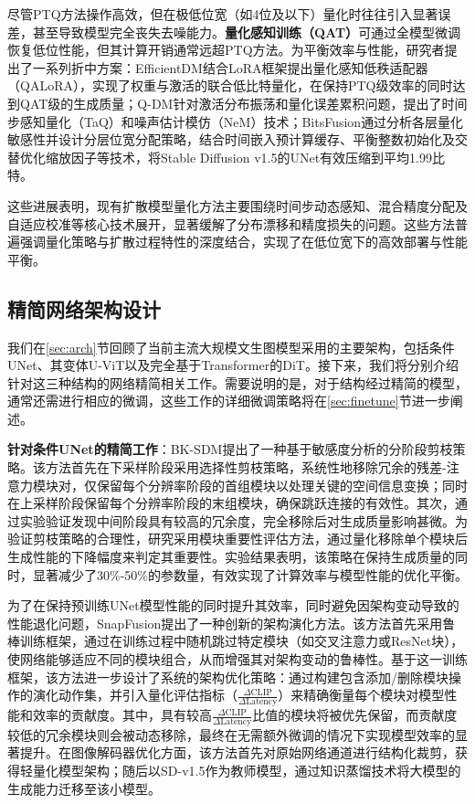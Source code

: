 \documentclass[11pt,a4paper,UTF8]{ctexart}
\begin{document}
尽管PTQ方法操作高效，但在极低位宽（如4位及以下）量化时往往引入显著误差，甚至导致模型完全丧失去噪能力\cite{he2023ptqd}。\textbf{量化感知训练（QAT）}\cite{krishnamoorthi2018quantizing,esser2019learned}可通过全模型微调恢复低位性能，但其计算开销通常远超PTQ方法。为平衡效率与性能，研究者提出了一系列折中方案：EfficientDM\cite{he2024efficientdm}结合LoRA框架\cite{hu2022lora}提出量化感知低秩适配器（QALoRA），实现了权重与激活的联合低比特量化，在保持PTQ级效率的同时达到QAT级的生成质量；Q-DM\cite{li2023qdm}针对激活分布振荡和量化误差累积问题，提出了时间步感知量化（TaQ）和噪声估计模仿（NeM）技术；BitsFusion\cite{sui2024bitsfusion}通过分析各层量化敏感性并设计分层位宽分配策略，结合时间嵌入预计算缓存、平衡整数初始化及交替优化缩放因子等技术，将Stable Diffusion v1.5的UNet有效压缩到平均1.99比特。

这些进展表明，现有扩散模型量化方法主要围绕时间步动态感知、混合精度分配及自适应校准等核心技术展开，显著缓解了分布漂移和精度损失的问题。这些方法普遍强调量化策略与扩散过程特性的深度结合，实现了在低位宽下的高效部署与性能平衡。


\subsection{精简网络架构设计}

我们在\ref{sec:arch}节回顾了当前主流大规模文生图模型采用的主要架构，包括条件UNet\cite{rombach2022high}、其变体U-ViT\cite{uvit}以及完全基于Transformer的DiT\cite{peebles2022scalable}。接下来，我们将分别介绍针对这三种结构的网络精简相关工作。需要说明的是，对于结构经过精简的模型，通常还需进行相应的微调，这些工作的详细微调策略将在\ref{sec:finetune}节进一步阐述。

\textbf{针对条件UNet的精简工作}：BK-SDM\cite{kim2023bk}提出了一种基于敏感度分析的分阶段剪枝策略。该方法首先在下采样阶段采用选择性剪枝策略，系统性地移除冗余的残差-注意力模块对，仅保留每个分辨率阶段的首组模块以处理关键的空间信息变换；同时在上采样阶段保留每个分辨率阶段的末组模块，确保跳跃连接的有效性。其次，通过实验验证发现中间阶段具有较高的冗余度，完全移除后对生成质量影响甚微。为验证剪枝策略的合理性，研究采用模块重要性评估方法，通过量化移除单个模块后生成性能的下降幅度来判定其重要性。实验结果表明，该策略在保持生成质量的同时，显著减少了30\%-50\%的参数量，有效实现了计算效率与模型性能的优化平衡。

为了在保持预训练UNet模型性能的同时提升其效率，同时避免因架构变动导致的性能退化问题，SnapFusion\cite{li2023snapfusion}提出了一种创新的架构演化方法。该方法首先采用鲁棒训练框架，通过在训练过程中随机跳过特定模块（如交叉注意力或ResNet块），使网络能够适应不同的模块组合，从而增强其对架构变动的鲁棒性。基于这一训练框架，该方法进一步设计了系统的架构优化策略：通过构建包含添加/删除模块操作的演化动作集，并引入量化评估指标（$\frac{\Delta\text{CLIP}}{\Delta\text{Latency}}$）来精确衡量每个模块对模型性能和效率的贡献度。其中，具有较高$\frac{\Delta\text{CLIP}}{\Delta\text{Latency}}$比值的模块将被优先保留，而贡献度较低的冗余模块则会被动态移除，最终在无需额外微调的情况下实现模型效率的显著提升。在图像解码器优化方面，该方法首先对原始网络通道进行结构化裁剪，获得轻量化模型架构；随后以SD-v1.5作为教师模型，通过知识蒸馏技术将大模型的生成能力迁移至该小模型。
\end{document}
